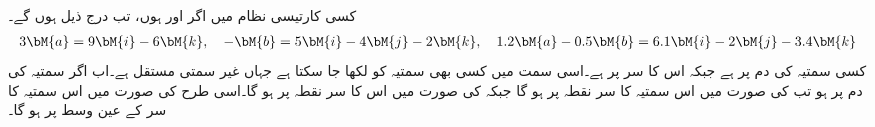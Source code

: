 کسی کارتیسی نظام میں اگر  اور  ہوں، تب درج ذیل ہوں گے۔
\begin{align*}
3\bM{a}=9\bM{i}-6\bM{k},\quad -\bM{b}=5\bM{i}-4\bM{j}-2\bM{k},\quad 1.2\bM{a}-0.5\bM{b}=6.1\bM{i}-2\bM{j}-3.4\bM{k}
\end{align*}
کسی سمتیہ{} کی دم  پر ہے جبکہ اس کا سر  پر ہے۔اسی سمت میں کسی بھی  سمتیہ  کو  لکھا جا سکتا ہے جہاں  غیر سمتی مستقل ہے۔اب اگر  سمتیہ کی دم   پر ہو تب   کی صورت میں اس سمتیہ کا سر نقطہ  پر ہو گا جبکہ  کی صورت میں اس کا سر نقطہ  پر ہو گا۔اسی طرح  کی صورت میں اس سمتیہ کا سر  کے عین وسط پر ہو گا۔


